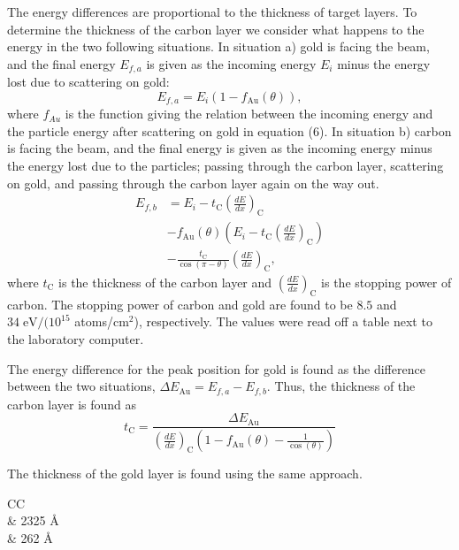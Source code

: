 The energy differences are proportional to the thickness of target layers. To determine the thickness of the carbon layer we consider what happens to the energy in the two following situations. In situation a) gold is facing the beam, and the final energy $E_{f,a}$ is given as the incoming energy $E_i$ minus the energy lost due to scattering on gold:
\begin{equation}
E_{f,a} = E_i (1-f_\mathrm{Au}(\theta)), 
\end{equation}
where $f_{Au}$ is the function giving the relation between the incoming energy and the particle energy after scattering on gold in equation (6).
In situation b) carbon is facing the beam, and the final energy is given as the incoming energy minus the energy lost due to the particles; passing through the carbon layer, scattering on gold, and passing through the carbon layer again on the way out. 
\begin{align}
E_{f,b} &= E_i - t_\mathrm{C} \left(\frac{dE}{dx}\right)_\mathrm{C} \nonumber
\\ &- f_\mathrm{Au}(\theta) \left(E_i - t_\mathrm{C} \left(\frac{dE}{dx}\right)_\mathrm{C} \right)\nonumber 
\\ &- \frac{t_\mathrm{C}}{\cos(\pi-\theta)} \left(\frac{dE}{dx}\right)_\mathrm{C},
\end{align}
where $t_\mathrm{C}$ is the thickness of the carbon layer and
$\left(\frac{dE}{dx}\right)_\mathrm{C}$ is the stopping power of carbon. The
stopping power of carbon and gold are found to be $8.5$ and $34 \;
\si{\electronvolt}/(10^{15}$ atoms/$\si{\centi\metre}^2$), respectively. The
values were read off a table next to the laboratory computer.

The energy difference for the peak position for gold is found as the difference
between the two situations, $\Delta E_\mathrm{Au} = E_{f,a} - E_{f,b}$. Thus,
the thickness of the carbon layer is found as
\begin{equation}
t_\mathrm{C} = \frac{\Delta E_{\mathrm{Au}}}{\left(\frac{dE}{dx}\right)_\mathrm{C} \left(1 - f_\mathrm{Au}(\theta) - \frac{1}{\cos(\theta)} \right)}
\end{equation}


The thickness of the gold layer is found using the same approach. 

\begin{table}[h]
\centering
\caption{Thickness of the target layers determined from change in energy.}
\begin{tabular}{CC}
\toprule
{}\\
\midrule
{} & 2325  \; \AA \\
 & 262  \; \AA \\
\bottomrule
\end{tabular}

\label{tab_thickness}
\end{table}

